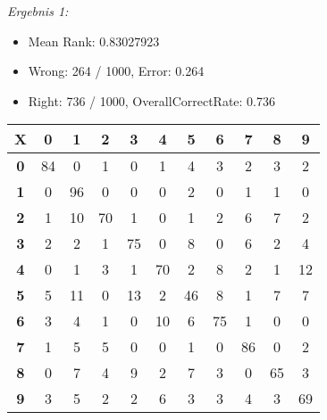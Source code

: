 \textit{Ergebnis 1:}
\begin{itemize}
    \item Mean Rank: 0.83027923
    \item Wrong: 264 / 1000, Error: 0.264
    \item Right: 736 / 1000, OverallCorrectRate: 0.736
\end{itemize}

\begin{tabular}{|c|c|c|c|c|c|c|c|c|c|c|}
\textbf{X} & \textbf{0} & \textbf{1} & \textbf{2} & \textbf{3} & \textbf{4} & \textbf{5} & \textbf{6} & \textbf{7} & \textbf{8} & \textbf{9} \\ \hline
\textbf{0} & 84 & 0 & 1 & 0 & 1 & 4 & 3 & 2 & 3 & 2 \\ 
\textbf{1} & 0 & 96 & 0 & 0 & 0 & 2 & 0 & 1 & 1 & 0 \\ 
\textbf{2} & 1 & 10 & 70 & 1 & 0 & 1 & 2 & 6 & 7 & 2 \\
\textbf{3} & 2 & 2 & 1 & 75 & 0 & 8 & 0 & 6 & 2 & 4 \\ 
\textbf{4} & 0 & 1 & 3 & 1 & 70 & 2 & 8 & 2 & 1 & 12 \\
\textbf{5} & 5 & 11 & 0 & 13 & 2 & 46 & 8 & 1 & 7 & 7 \\ 
\textbf{6} & 3 & 4 & 1 & 0 & 10 & 6 & 75 & 1 & 0 & 0 \\ 
\textbf{7} & 1 & 5 & 5 & 0 & 0 & 1 & 0 & 86 & 0 & 2 \\ 
\textbf{8} & 0 & 7 & 4 & 9 & 2 & 7 & 3 & 0 & 65 & 3 \\ 
\textbf{9} & 3 & 5 & 2 & 2 & 6 & 3	 & 3 & 4 & 3 & 69 \\ 
\end{tabular}